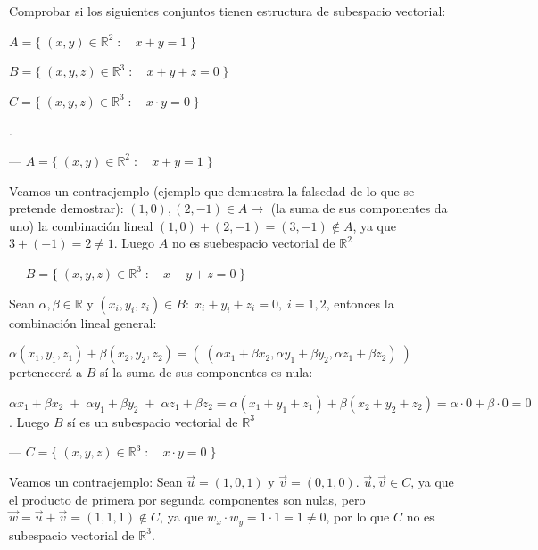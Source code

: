 \begin{ejre}
	Comprobar si los siguientes conjuntos tienen estructura de subespacio vectorial:
	
	$A=\{\; (x,y)\in \mathbb R^2 \; :\quad x+y=1\;\} $
	
	$B=\{\; (x,y,z)\in \mathbb R^3 \; : \quad x+y+z=0\;\} $
	
	$C=\{\;(x,y,z)\in \mathbb R^3 \; : \quad x\cdot y=0 \;\} $
	
\end{ejre}
\begin{proofw}\renewcommand{\qedsymbol}{$\diamond$}.

--- $A=\{\; (x,y)\in \mathbb R^2 \; :\quad x+y=1\;\} $

\noindent Veamos un contraejemplo \textcolor{gris}{(ejemplo que demuestra la falsedad de lo que se pretende demostrar)}: $(1,0), (2,-1) \in A \to$ (la suma de sus componentes da uno) la combinación lineal $(1,0) +( 2,-1)=(3,-1) \notin A$, ya que $3+(-1)=2\neq 1$. Luego $A$ no es suebespacio vectorial de $\mathbb R^2$
	
--- $B=\{\; (x,y,z)\in \mathbb R^3 \; : \quad x+y+z=0\;\} $

\noindent Sean $\alpha, \beta \in \mathbb R$ y $(x_i,y_i,z_i) \in B:\; x_i+y_i+z_i=0,\; i=1,2$, entonces la combinación lineal general: 

\noindent $\alpha (x_1,y_1,z_1)+\beta (x_2,y_2,z_2)=\left(\;  (\alpha x_1+\beta x_2, \alpha y_1+\beta y_2, \alpha z_1+\beta z_2)\; \right)$ pertenecerá a $B$ sí la suma de sus componentes es nula:

\noindent $\alpha x_1+\beta x_2\; +\; \alpha y_1+\beta y_2 \; +\; \alpha z_1+\beta z_2 = \alpha(x_1+y_1+z_1)+\beta (x_2+y_2+z_2)=\alpha \cdot 0 + \beta \cdot 0=0$. Luego $B$ sí es un subespacio vectorial de $\mathbb R^3$
	
--- $C=\{\;(x,y,z)\in \mathbb R^3 \; : \quad x\cdot y=0 \;\} $

\noindent Veamos un contraejemplo: Sean $\vec u=(1,0,1)$ y $\vec v=(0,1,0)$. $\vec u, \vec v \in C$, ya que el producto de primera por segunda componentes son nulas, pero $\vec w=\vec u + \vec v =(1,1,1)\notin C$, ya que $w_x\cdot w_y=1\cdot 1 = 1 \neq 0$, por lo que $C$ no es subespacio vectorial de $\mathbb R^3$.
	
\end{proofw}


